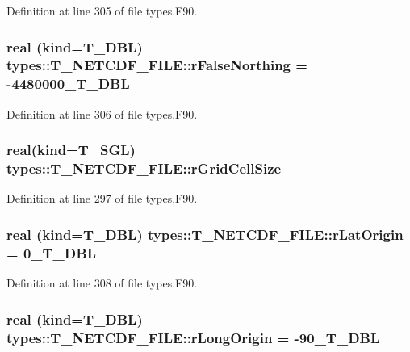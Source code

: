 Definition at line 305 of file types.F90.

\hypertarget{typetypes_1_1_t___n_e_t_c_d_f___f_i_l_e_a03e8f9f6b812c9414c76c392b35c28a4}{
\subsubsection[{rFalseNorthing}]{\setlength{\rightskip}{0pt plus 5cm}real (kind={\bf T\_\-DBL}) {\bf types::T\_\-NETCDF\_\-FILE::rFalseNorthing} = -\/4480000\_\-T\_\-DBL}}
\label{typetypes_1_1_t___n_e_t_c_d_f___f_i_l_e_a03e8f9f6b812c9414c76c392b35c28a4}


Definition at line 306 of file types.F90.

\hypertarget{typetypes_1_1_t___n_e_t_c_d_f___f_i_l_e_a52fa78589f7bd55ad7aa5fe2e5cc8e74}{
\subsubsection[{rGridCellSize}]{\setlength{\rightskip}{0pt plus 5cm}real(kind={\bf T\_\-SGL}) {\bf types::T\_\-NETCDF\_\-FILE::rGridCellSize}}}
\label{typetypes_1_1_t___n_e_t_c_d_f___f_i_l_e_a52fa78589f7bd55ad7aa5fe2e5cc8e74}


Definition at line 297 of file types.F90.

\hypertarget{typetypes_1_1_t___n_e_t_c_d_f___f_i_l_e_a0ec0a310a81bdbc04a5574af35d4cf02}{
\subsubsection[{rLatOrigin}]{\setlength{\rightskip}{0pt plus 5cm}real (kind={\bf T\_\-DBL}) {\bf types::T\_\-NETCDF\_\-FILE::rLatOrigin} = 0\_\-T\_\-DBL}}
\label{typetypes_1_1_t___n_e_t_c_d_f___f_i_l_e_a0ec0a310a81bdbc04a5574af35d4cf02}


Definition at line 308 of file types.F90.

\hypertarget{typetypes_1_1_t___n_e_t_c_d_f___f_i_l_e_addf7ab3c2b1f091b25eff5022f997522}{
\subsubsection[{rLongOrigin}]{\setlength{\rightskip}{0pt plus 5cm}real (kind={\bf T\_\-DBL}) {\bf types::T\_\-NETCDF\_\-FILE::rLongOrigin} = -\/90\_\-T\_\-DBL}}
\label{typetypes_1_1_t___n_e_t_c_d_f___f_i_l_e_addf7ab3c2b1f091b25eff5022f997522}


